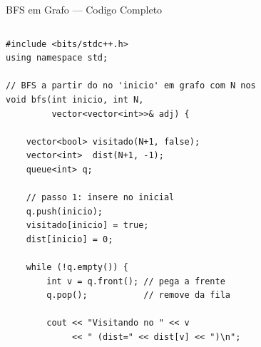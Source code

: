 \documentclass[aspectratio=169,11pt]{beamer}
\begin{document}
\begin{frame}[fragile,shrink=8]{BFS em Grafo --- Codigo Completo}
  \begin{columns}[t]
      \begin{tcolorbox}[caixaCodigo]
        \begin{lstlisting}[style=cppsmall]
#include <bits/stdc++.h>
using namespace std;

// BFS a partir do no 'inicio' em grafo com N nos
void bfs(int inicio, int N,
         vector<vector<int>>& adj) {

    vector<bool> visitado(N+1, false);
    vector<int>  dist(N+1, -1);
    queue<int> q;

    // passo 1: insere no inicial
    q.push(inicio);
    visitado[inicio] = true;
    dist[inicio] = 0;

    while (!q.empty()) {
        int v = q.front(); // pega a frente
        q.pop();           // remove da fila

        cout << "Visitando no " << v
             << " (dist=" << dist[v] << ")\n";


\end{lstlisting}
\end{tcolorbox}
\end{columns}
\end{frame}
\end{document}
